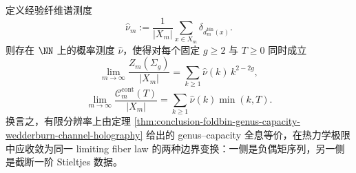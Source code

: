 \begin{conjecture}\label{conj:conclusion-foldbin-genus-capacity-thermodynamic-duality}
定义经验纤维谱测度
\[
\widehat\nu_m:=\frac{1}{|X_m|}\sum_{x\in X_m}\delta_{d_m^{\mathrm{bin}}(x)}.
\]
则存在 \(\NN\) 上的概率测度 \(\widehat\nu\)，使得对每个固定 \(g\ge 2\) 与 \(T\ge 0\) 同时成立
\[
\lim_{m\to\infty}\frac{Z_m(\Sigma_g)}{|X_m|}
=
\sum_{k\ge 1}\widehat\nu(k)\,k^{2-2g},
\]
\[
\lim_{m\to\infty}\frac{\mathcal C_m^{\mathrm{cont}}(T)}{|X_m|}
=
\sum_{k\ge 1}\widehat\nu(k)\min(k,T).
\]
换言之，有限分辨率上由定理 \ref{thm:conclusion-foldbin-genus-capacity-wedderburn-channel-holography} 给出的 genus--capacity 全息等价，在热力学极限中应收敛为同一 limiting fiber law 的两种边界变换：一侧是负偶矩序列，另一侧是截断一阶 Stieltjes 数据。
\end{conjecture}
